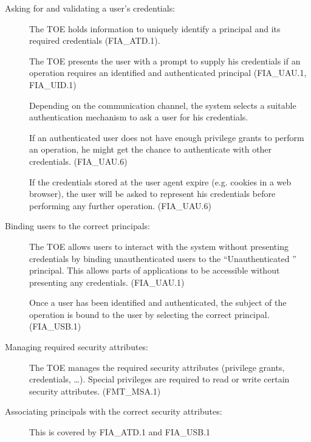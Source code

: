 \documentclass[12pt,english]{scrbook}
\begin{document}
    \begin{description}
        \item[Asking for and validating a user's credentials:]

            The TOE holds information to uniquely identify a principal and its
            required credentials (FIA\_ATD.1).

            The TOE presents the user with a prompt to supply his credentials
            if an operation requires an identified and authenticated principal (FIA\_UAU.1, FIA\_UID.1)

            Depending on the communication channel, the system selects a
            suitable authentication mechanism to ask a user for his
            credentials. 

            If an authenticated user does not have enough privilege grants to
            perform an operation, he might get the chance to authenticate with
            other credentials. (FIA\_UAU.6)

            If the credentials stored at the user agent expire (e.g.  cookies
            in a web browser), the user will be asked to represent his
            credentials before performing any further operation. (FIA\_UAU.6)

        \item[Binding users to the correct principals:]

            The TOE allows users to interact with the system without presenting
            credentials by binding unauthenticated users to the ``Unauthenticated ''
            principal. This allows parts of applications to be accessible without
            presenting any credentials. (FIA\_UAU.1)

            Once a user has been identified and authenticated, the subject of
            the operation is bound to the user by selecting the correct
            principal. (FIA\_USB.1)

        \item[Managing required security attributes:]

            The TOE manages the required security attributes (privilege
            grants, credentials, \dots). Special privileges are required
            to read or write certain security attributes. (FMT\_MSA.1)

        \item[Associating principals with the correct security attributes:]

            This is covered by FIA\_ATD.1 and FIA\_USB.1

    \end{description}
\end{document}
